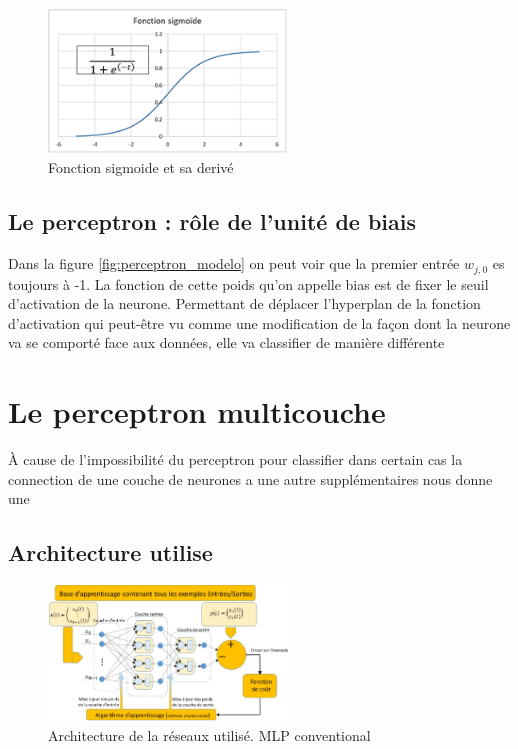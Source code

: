 \documentclass[journal]{IEEEtran}
\begin{document}
\begin{figure}[h]
	\centering
	\includegraphics[width=2.5in]{sigmoide}
	\caption{Fonction sigmoide et sa derivé}
	\label{fig:sigmoide}
\end{figure}

\subsection{Le perceptron : rôle de l’unité de biais}
Dans la figure \ref{fig:perceptron_modelo} on peut voir que la premier entrée $ w_{j,0} $ es toujours à -1. La fonction 
de cette poids qu'on appelle bias est de fixer le seuil d'activation de la neurone. Permettant de déplacer l'hyperplan 
de la fonction d'activation qui peut-être vu comme une modification de la façon dont la neurone va se comporté face aux données, elle va classifier de manière différente



\section{Le perceptron  multicouche}
À cause de l'impossibilité du perceptron  pour classifier dans certain cas la connection de une couche
de neurones a une autre supplémentaires nous donne une 



\subsection{Architecture utilise}

\begin{figure}[h]
	\centering
	\includegraphics[width=2.5in]{arch}
	\caption{Architecture de la réseaux utilisé. MLP conventional }
	\label{fig:ArchitectureMLP}
\end{figure}
\end{document}
